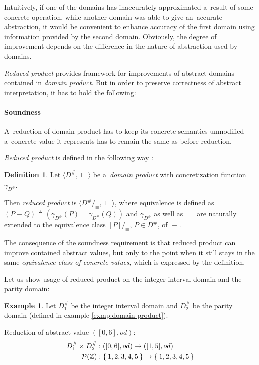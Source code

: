 \documentclass[12pt,oneside]{fithesis2}
\theoremstyle{definition}
\newtheorem{exmp}{Example}[section]
\newtheorem{definition}{Definition}
\begin{document}
Intuitively, if one of the domains has inaccurately approximated a~result of some concrete operation, while another domain was able to give an~accurate abstraction, it would be convenient to enhance accuracy of the first domain using information provided by the second domain. Obviously, the degree of improvement depends on the difference in the nature of abstraction used by domains.

\textit{Reduced product} provides framework for improvements of abstract domains contained in \textit{domain product}. But in order to preserve correctness of abstract interpretation, it has to hold the following:

\paragraph{Soundness}
A~reduction of domain product has to keep its concrete semantics unmodified -- a~concrete value it represents has to remain the same as before reduction.

\textit{Reduced product} is defined in the following way \cite{CousotCousotMauborgne-FoSSaCS-11}:

\begin{definition}
  Let $\langle D^\#, \sqsubseteq \rangle$ be a~\textit{domain product} with concretization function $\gamma_{D^\#}$.

  Then \textit{reduced product} is $\langle D^\# /_\equiv, \sqsubseteq \rangle$, where equivalence is defined as  $\left(P \equiv Q \right) \triangleq \left(\gamma_{D^\#}(P) = \gamma_{D^\#}(Q) \right)$ and $\gamma_{D^\#}$ as well as $\sqsubseteq$ are naturally extended to the equivalence class $[P]/_\equiv$, $P \in D^\#$, of $\equiv$.
\end{definition}

The consequence of the soundness requirement is that reduced product can improve contained abstract values, but only to the point when it still stays in the same \textit{equivalence class of concrete values}, which is expressed by the definition.

Let us show usage of reduced product on the integer interval domain and the parity domain:

\begin{exmp}
  Let $D^\#_1$ be the integer interval domain and $D^\#_2$ be the parity domain (defined in example \ref{exmp:domain-product}).

  Reduction of abstract value $\left( [0,6], od \right)$:
  \begin{align*}
    D^\#_1 \times D^\#_2 &: \left( [0,6], od \right) \to \left([1, 5], od \right)\\
    \mathcal P(\mathbb Z) &: \Set{1,2,3,4,5} \to \Set{1,2,3,4,5}
  \end{align*}
\end{exmp}
\end{document}
